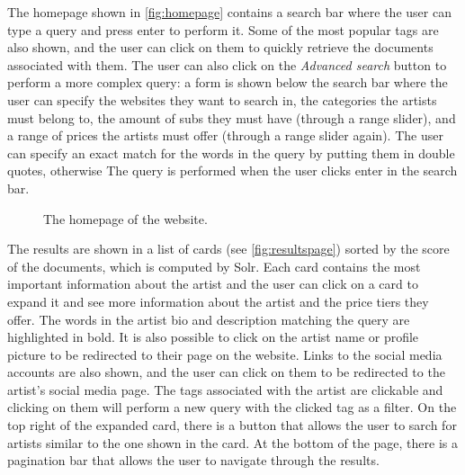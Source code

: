 \documentclass[tikz,14pt]{article}
\begin{document}
The homepage shown in \autoref{fig:homepage} contains a search bar where the user can type a query and press enter to perform it.
Some of the most popular tags are also shown, and the user can click on them to quickly retrieve the documents associated with them.
The user can also click on the \textit{Advanced search} button to perform a more complex query: 
a form is shown below the search bar where the user can specify the websites they want to search in,
the categories the artists must belong to, the amount of subs they must have (through a range slider), 
and a range of prices the artists must offer (through a range slider again).
The user can specify an exact match for the words in the query by putting them in double quotes, 
otherwise  
The query is performed when the user clicks enter in the search bar.


\begin{figure}[H]
    \centering
    \caption{The homepage of the website.}
    \label{fig:homepage}
\end{figure}

The results are shown in a list of cards (see \autoref{fig:resultspage}) sorted by the score of the documents, which is computed by Solr.
Each card contains the most important information about the artist and the user can click on a card to expand it 
and see more information about the artist and the price tiers they offer.
The words in the artist bio and description matching the query are highlighted in bold.
It is also possible to click on the artist name or profile picture to be redirected to their page on the website.
Links to the social media accounts are also shown, and the user can click on them to be redirected to the artist's social media page.
The tags associated with the artist are clickable and clicking on them will perform a new query with the clicked tag as a filter.
On the top right of the expanded card, there is a button that allows the user to sarch for artists similar to the one shown in the card.
At the bottom of the page, there is a pagination bar that allows the user to navigate through the results.
\end{document}

